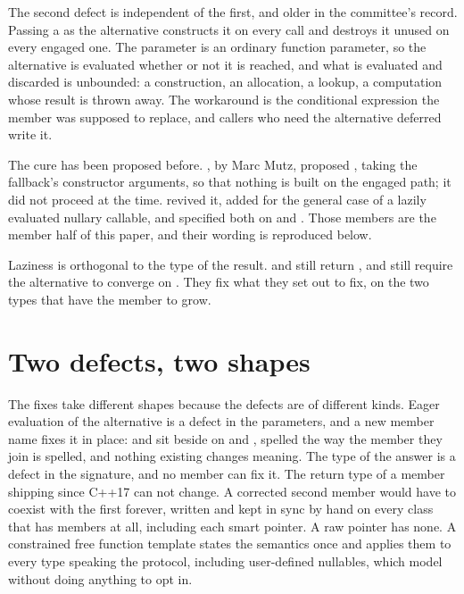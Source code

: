 \documentclass[a4paper,10pt,oneside,openany,final,article]{memoir}
\begin{document}
The second defect is independent of the first, and older in the committee's
record. Passing a  as the alternative constructs it on every
call and destroys it unused on every engaged one.
The parameter is an ordinary function parameter, so the alternative is
evaluated whether or not it is reached, and what is evaluated and discarded
is unbounded: a construction, an allocation, a lookup, a computation whose
result is thrown away. The workaround is the conditional expression the
member was supposed to replace, and callers who need the alternative
deferred write it.

The cure has been proposed before. \cite{P2218R0}, by Marc Mutz, proposed
, taking the fallback's constructor arguments, so
that nothing is built on the engaged path; it did not proceed at the time. \cite{P3413R0} revived it, added
 for the general case of a lazily evaluated nullary
callable, and specified both on  and
. Those members are the member half of this paper, and
their wording is reproduced below.

Laziness is orthogonal to the type of the result. 
and  still return , and still require the
alternative to converge on . They fix what they set out to fix, on
the two types that have the member to grow.

\section{Two defects, two shapes}

The fixes take different shapes because the defects are of different kinds.
Eager evaluation of the alternative is a defect in the parameters, and a new
member name fixes it in place:  and  sit beside
 on  and , spelled the way
the member they join is spelled, and nothing existing changes meaning. The
type of the answer is a defect in the signature, and no member can fix it.
The return type
of a member shipping since C++17 can not change. A corrected second member
would have to coexist with the first forever, written and kept in sync by
hand on every class that has members at all, including each smart pointer. A
raw pointer has none. A constrained free function template states the
semantics once and applies them to every type speaking the protocol,
including user-defined nullables, which model  without doing
anything to opt in.
\end{document}
